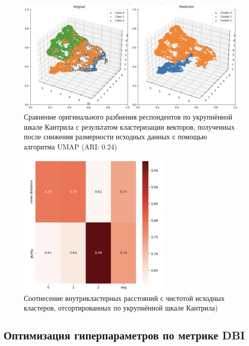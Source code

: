 \begin{figure}
	\begin{center}
		\includegraphics[width=\textwidth]{images/14.png}
	\end{center}
	\caption{Сравнение оригинального разбиения респондентов по укрупнённой шкале Кантрила с результатом кластеризации векторов, полученных после снижения размерности исходных данных с помощью алгоритма UMAP (ARI: 0.24)}
	\label{img:12}
\end{figure}

\begin{figure}
	\begin{center}
		\includegraphics[width=0.65\textwidth]{images/16.png}
	\end{center}
	\caption{Соотнесение внутрикластерных расстояний с чистотой исходных кластеров, отсортированных по укрупнённой шкале Кантрила)}
	\label{img:13}
\end{figure}

\FloatBarrier

\subsection{Оптимизация гиперпараметров по метрике DBI}

